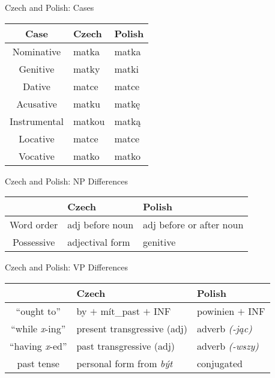 \documentclass{beamer}
\begin{document}
\begin{frame}{Czech and Polish: Cases}
\begin{center}
    \begin{tabular}{ | c | l | l |}
    \hline
    Case & Czech & Polish \\ \hline

    Nominative & matka & matka \\
    Genitive & matky & matki \\
    Dative & matce & matce \\
    Acusative & matku & matk\k{e} \\
    Instrumental & matkou & matk\k{a} \\
    Locative & matce & matce \\
    Vocative & matko & matko \\
    \hline
    \end{tabular}
\end{center}
\end{frame}

\begin{frame}{Czech and Polish: NP Differences}

\begin{center}
    \begin{tabular}{ | c | l | l |}
    \hline
     & Czech & Polish \\ \hline

    Word order & adj before noun & adj before or after noun \\
    Possessive & adjectival form & genitive \\
    \hline
    \end{tabular}
\end{center}
\end{frame}

\begin{frame}{Czech and Polish: VP Differences}

\begin{center}
    \begin{tabular}{ | c | l | l |}
    \hline
     & Czech & Polish \\ \hline

    ``ought to'' & by $+$ m\'{i}t_{past} $+$ INF & powinien $+$ INF \\
    ``while {\it x}-ing'' & present transgressive (adj) & adverb {\it (-j\k{a}c)}\\
    ``having {\it x}-ed'' & past transgressive (adj) & adverb {\it (-wszy)} \\
    past tense & personal form from {\it b\'{y}t} & conjugated \\
    \hline
    \end{tabular}
\end{center}
\end{frame}
\end{document}
